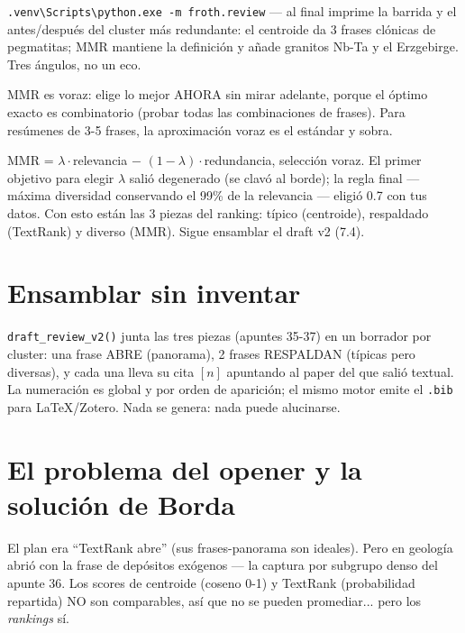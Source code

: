 \documentclass[11pt,a4paper]{article}
\begin{document}
\begin{practica}
\texttt{.venv\textbackslash Scripts\textbackslash python.exe -m froth.review} ---
al final imprime la barrida y el antes/después del cluster más redundante: el centroide
da 3 frases clónicas de pegmatitas; MMR mantiene la definición y añade granitos Nb-Ta y
el Erzgebirge. Tres ángulos, no un eco.
\end{practica}

\begin{ojo}
MMR es voraz: elige lo mejor AHORA sin mirar adelante, porque el óptimo exacto es
combinatorio (probar todas las combinaciones de frases). Para resúmenes de 3-5 frases,
la aproximación voraz es el estándar y sobra.
\end{ojo}

\begin{resumen}
MMR = $\lambda \cdot$relevancia $-$ $(1-\lambda) \cdot$redundancia, selección voraz.
El primer objetivo para elegir $\lambda$ salió degenerado (se clavó al borde); la regla
final --- máxima diversidad conservando el 99\% de la relevancia --- eligió 0.7 con tus
datos. Con esto están las 3 piezas del ranking: típico (centroide), respaldado
(TextRank) y diverso (MMR). Sigue ensamblar el draft v2 (7.4).
\end{resumen}
\clearpage
{}
{}

\section{Ensamblar sin inventar}

\texttt{draft\_review\_v2()} junta las tres piezas (apuntes 35-37) en un borrador por
cluster: una frase ABRE (panorama), 2 frases RESPALDAN (típicas pero diversas), y cada
una lleva su cita $[n]$ apuntando al paper del que salió textual. La numeración es
global y por orden de aparición; el mismo motor emite el \texttt{.bib} para LaTeX/Zotero.
Nada se genera: nada puede alucinarse.

\section{El problema del opener y la solución de Borda}

El plan era ``TextRank abre'' (sus frases-panorama son ideales). Pero en geología abrió
con la frase de depósitos exógenos --- la captura por subgrupo denso del apunte 36. Los
scores de centroide (coseno 0-1) y TextRank (probabilidad repartida) NO son comparables,
así que no se pueden promediar... pero los \emph{rankings} sí.
\end{document}
